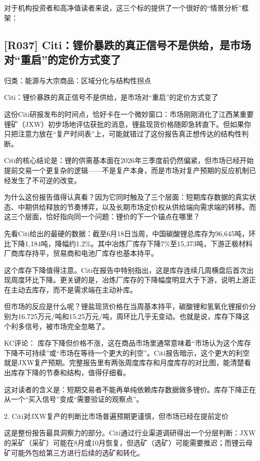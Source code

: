 \documentclass[11pt]{ctexart}
\begin{document}
对于机构投资者和高净值读者来说，这三个标的提供了一个很好的“情景分析”框架：

\subsection{[R037] Citi：锂价暴跌的真正信号不是供给，是市场对“重启”的定价方式变了}
{\small\color{refgray}归类：能源与大宗商品：区域分化与结构性拐点}

Citi：锂价暴跌的真正信号不是供给，是市场对“重启”的定价方式变了

这份Citi研报发布的时间点，恰好卡在一个微妙窗口：市场刚刚消化了江西某重要锂矿（JXW）初步场地评估获批的消息，锂盐现货价格随即急转直下。但如果你只把注意力放在“复产时间表”上，可能就错过了这份报告真正想传达的结构性判断。

Citi的核心结论是：锂的供需基本面在2026年三季度前仍然偏紧，但市场已经开始提前交易一个更复杂的逻辑——不是复产本身，而是市场对复产预期的反应机制已经发生了不可逆的改变。

为什么这份报告值得认真看？因为它同时触及了三个层面：短期库存数据的真实状态、中期供给释放的节奏博弈，以及长期市场定价权从供给端向需求端的转移。而这三个层面，恰好指向同一个问题：锂价的下一个锚点在哪里？

先看Citi给出的最硬的数据：截至6月18日当周，中国碳酸锂总库存为96,645吨，环比下降1,184吨，降幅约1.2\%。其中冶炼厂库存下降7\%至15,373吨，下游正极材料厂商库存持平，贸易商和电池厂库存也基本持平。

这个库存下降值得注意。Citi在报告中特别指出，这是库存连续几周横盘后首次出现周度环比下降。更关键的是，冶炼厂库存的下降幅度明显大于下游，说明上游正在主动去库存，而不是需求端在主动补库。

但市场的反应是什么呢？锂盐现货价格在当周基本持平，碳酸锂和氢氧化锂报价分别为16.725万元/吨和15.25万元/吨，周环比几乎无变动。也就是说，库存下降这个利多信号，被市场完全忽略了。

KC评论： 库存下降但价格不涨，这在商品市场里通常意味着“市场认为这个库存下降不可持续”或“市场在等待一个更大的利空”。Citi报告暗示，这个更大的利空就是JXW复产预期。完整报告里有两张周度库存和月度库存的对比图，能清楚看出库存下降的节奏和结构，值得仔细看。

这对读者的含义是：短期交易者不能再单纯依赖库存数据做多锂价。库存下降正在从一个“买入信号”变成“需要验证的观察点”。

2. Citi对JXW复产的判断比市场普遍预期更谨慎，但市场已经在提前定价

这是整份报告最具洞察力的部分。Citi通过行业渠道调研得出一个分层判断：JXW的采矿（采矿）可能在8月或10月恢复，但选矿（选矿）可能需要推迟；而锂云母矿可能外包给第三方进行后续的选矿和转化。
\end{document}
